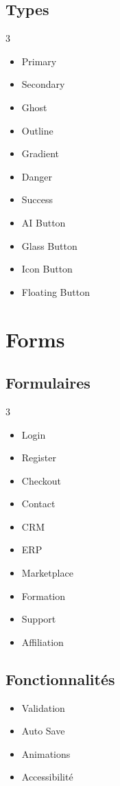 \documentclass[12pt,a4paper,oneside]{book}
\begin{document}
\section{Types}
\begin{multicols}{3}
\begin{itemize}
\item Primary
\item Secondary
\item Ghost
\item Outline
\item Gradient
\item Danger
\item Success
\item AI Button
\item Glass Button
\item Icon Button
\item Floating Button
\end{itemize}
\end{multicols}

\chapter{Forms}

\section{Formulaires}
\begin{multicols}{3}
\begin{itemize}
\item Login
\item Register
\item Checkout
\item Contact
\item CRM
\item ERP
\item Marketplace
\item Formation
\item Support
\item Affiliation
\end{itemize}
\end{multicols}

\section{Fonctionnalités}
\begin{itemize}
\item Validation
\item Auto Save
\item Animations
\item Accessibilité
\end{itemize}
\end{document}
